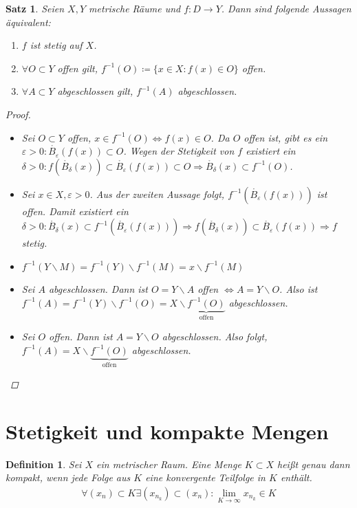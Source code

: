 \documentclass[ngerman,titlepage,twoside, parskip=half*]{scrreprt}
\theoremstyle{break}
\newtheorem{theorem}{Satz}[section]
\newtheorem{definition}{Definition}[chapter]
\theoremstyle{nonumberbreak}
\newtheorem{proof}{Beweis:}
\begin{document}
\begin{theorem}\label{satz:fkt-aquiv}
  Seien $X,Y$ metrische Räume und $f\colon D\rightarrow Y$. Dann sind folgende
  Aussagen äquivalent:
  \begin{enumerate}[(1)]
   \item $f$ ist stetig auf $X$.
   \item $\forall O \subset Y$ offen gilt, $f^{-1}(O)\coloneqq\{x\in X\colon
    f(x)\in O\}$ offen.
   \item $\forall A \subset Y$ abgeschlossen gilt, $f^{-1}(A)$ abgeschlossen.
  \end{enumerate}
  \begin{proof}
    \begin{itemize}
     \item[(1)$\Rightarrow$ (2)] Sei $O\subset Y$ offen, $x\in
      f^{-1}(O)\Leftrightarrow f(x)\in O$. Da $O$ offen ist, gibt es ein
      $\varepsilon >0\colon\mathring{B_{\varepsilon}} (f(x))\subset O$. Wegen
      der Stetigkeit von $f$ existiert ein $\delta >0\colon
      f(\mathring{B_{\delta}}(x))\subset
      \mathring{B_{\varepsilon}}(f(x))\subset O \Longrightarrow
      \mathring{B_{\delta}}(x)\subset f^{-1}(O)$.
     \item[(2)$\Rightarrow$ (1)] Sei $x\in X, \varepsilon >0$. Aus der zweiten
      Aussage folgt, $f^{-1}(\mathring {B_{\varepsilon}}(f(x)))$ ist offen.
      Damit existiert ein $\delta >0\colon\mathring{B_{\delta}}(x)\subset
      f^{-1}(\mathring {B_{\varepsilon}}(f(x)))\Rightarrow
      f(\mathring{B_{\delta}}(x))\subset \mathring{B_{\varepsilon}} (f(x))
      \Rightarrow f$ stetig.
     \item[(2)$\Leftrightarrow$ (3)] $f^{-1}(Y\backslash
      M)=f^{-1}(Y)\backslash f^{-1}(M)=x\backslash f^{-1}(M)$
     \item[(2)$\Rightarrow$ (3)] Sei $A$ abgeschlossen. Dann ist
      $O=Y\backslash A$ offen $\Leftrightarrow A=Y\backslash O$. Also ist
      $f^{-1}(A)=f^{-1}(Y)\backslash f^{-1}(O)=X\backslash
      \underbrace{f^{-1}(O)}_{\text{offen}}$ abgeschlossen.
     \item[(3)$\Rightarrow$ (2)] Sei $O$ offen. Dann ist $A=Y\backslash O$
      abgeschlossen. Also folgt, $f^{-1}(A) =X\backslash
      \underbrace{f^{-1}(O)}_{\text{offen}}$ abgeschlossen.
\end{itemize}
  \end{proof}
\end{theorem}

\section{Stetigkeit und kompakte Mengen}
\begin{definition}
Sei $X$ ein metrischer Raum. Eine Menge $K\subset X$ heißt genau dann \emph{kompakt},
wenn jede Folge aus $K$ eine konvergente Teilfolge in $K$ enthält.
\begin{gather*}\forall (x_n) \subset K \exists (x_{n_k})\subset (x_n)\colon\lim_{K\rightarrow \infty} x_{n_k}\in K\end{gather*}
\end{definition}
\end{document}
